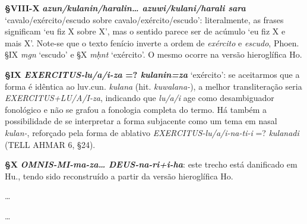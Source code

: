 \smallskip
\noindent\textbf{§VIII-X}\tabto{4em}
\textbf{\emph{azun\slash{}kulanin\slash{}haralin\ldots{} azuwi\slash{}kulani\slash{}harali sara}}
`cavalo\slash{}exér\-ci\-to\slash{}escudo sobre cavalo\slash{}exército\slash{}escudo':
literalmente, as frases significam `eu fiz X sobre X', mas o sentido parece ser
de acúmulo `eu fiz X e mais X'.
Note-se que o texto fenício inverte a ordem de \emph{exército} e \emph{escudo},
Phoen. §IX \emph{mgn} `escudo' e §X \emph{mḥnt} `exército'.
O mesmo ocorre na versão hieroglífica Ho.

\smallskip
\noindent\textbf{§IX}\tabto{2em}
\textbf{\emph{\emph{EXERCITUS}-lu/a/i-za} {=?} \emph{kulanin=za}} `exército': se
aceitarmos que a for\-ma é idêntica ao luv.cun. \emph{kulana} (hit.
\emph{kuwalana-}), a melhor transliteração seria
\emph{\emph{EXERCITUS}+LU/A/I-za}, indicando que \emph{lu/a/i} age como
desambiguador fonológico e não se grafou a fonologia completa do termo.
Há também a possibilidade de se interpretar a forma subjacente como um tema em
nasal \emph{kulan-}, reforçado pela forma de ablativo
\emph{\emph{EXERCITUS}-lu/a/i-na-ti-i} {=?} \emph{kulanadi} (TELL AHMAR 6,
§24).

\smallskip
\noindent\textbf{§X}\tabto{2em}
\textbf{\emph{\emph{OMNIS}-MI-ma-za\ldots{} \emph{DEUS}-na-ri+i-ha}}: este trecho
está danificado em Hu., tendo sido reconstruído a partir da versão hieroglífica Ho.

\clearpage
\setcounter{parcount}{10}
\begin{parnumbersr}

	\raggedright%
	\itshape%

	\ldots{}


\end{parnumbersr}

\setcounter{parcount}{10}


\begin{parnumbersr}

	\raggedright%
	\itshape%

	\ldots{}

\end{parnumbersr}

